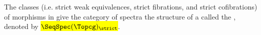 \begin{theorem} \label{theorem:strict_level_model_category_structure_on_the_category_of_spectra}
    The classes (i.e. strict weak equivalences, strict fibrations, and strict cofibrations) of morphisms in  give the category of spectra the structure of a  called the , denoted by \hl{$\SeqSpec(\Topcg)_\strict$}.
\end{theorem}